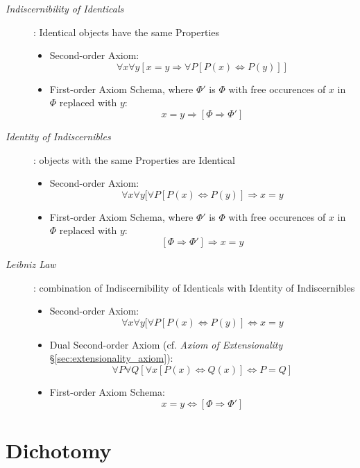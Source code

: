\begin{description}

\item[\emph{Indiscernibility of Identicals}]: Identical objects have
the same Properties
\begin{itemize}
    \item Second-order Axiom:
    \[
        \forall x \forall y
        [ x = y \Rightarrow \forall P [ P(x) \Leftrightarrow P(y) ]]
    \]
    \item First-order Axiom Schema, where $\Phi'$ is $\Phi$ with free
      occurences of $x$ in $\Phi$ replaced with $y$:
    \[
        x = y \Rightarrow [\Phi \Rightarrow \Phi']
    \]
\end{itemize}

\item[\emph{Identity of Indiscernibles}]: objects with the same Properties
are Identical
\begin{itemize}
    \item Second-order Axiom:
    \[
        \forall x \forall y
        [ \forall P [ P(x) \Leftrightarrow P(y) ] \Rightarrow x = y
    \]
    \item First-order Axiom Schema, where $\Phi'$ is $\Phi$ with free
      occurences of $x$ in $\Phi$ replaced with $y$:
    \[
        [\Phi \Rightarrow \Phi'] \Rightarrow x = y
    \]
\end{itemize}

\item[\emph{Leibniz Law}]: combination of Indiscernibility of
  Identicals with Identity of Indiscernibles
\begin{itemize}
    \item Second-order Axiom:
    \[
        \forall x \forall y
        [ \forall P [ P(x) \Leftrightarrow P(y) ] \Leftrightarrow x = y
    \]
    \item Dual Second-order Axiom (cf. \emph{Axiom of Extensionality}
      \S\ref{sec:extensionality_axiom}):
    \[
        \forall P \forall Q
        [ \forall x [P(x) \Leftrightarrow Q(x)] \Leftrightarrow P = Q ]
    \]
    \item First-order Axiom Schema:
    \[
        x = y \Leftrightarrow [\Phi \Rightarrow \Phi']
    \]
\end{itemize}


\end{description}



\section{Dichotomy}\label{sec:dichotomy}

